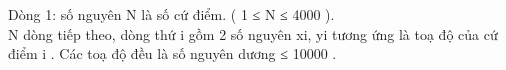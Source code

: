 Dòng 1: số nguyên N là số cứ điểm. ( 1 ≤ N ≤ 4000 ).   
\\   N dòng tiếp theo, dòng thứ i gồm 2 số nguyên xi, yi tương ứng là toạ độ của cứ điểm i . Các toạ độ đều là số nguyên dương ≤ 10000 .